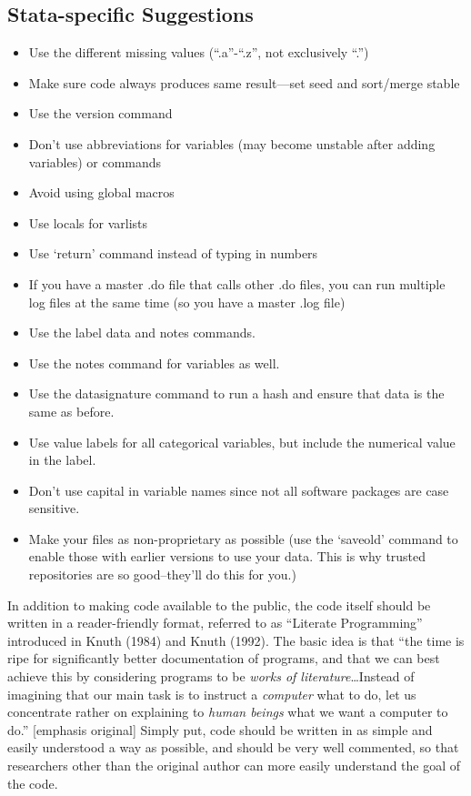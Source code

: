 \documentclass[12pt] {article}
\begin{document}
\subsection{Stata-specific
Suggestions}\label{stata-specific-suggestions}

\begin{itemize}
\item
  Use the different missing values (``.a''-``.z'', not exclusively
  ``.'')
\item
  Make sure code always produces same result---set seed and sort/merge
  stable
\item
  Use the version command
\item
  Don't use abbreviations for variables (may become unstable after
  adding variables) or commands
\item
  Avoid using global macros
\item
  Use locals for varlists
\item
  Use `return' command instead of typing in numbers
\item
  If you have a master .do file that calls other .do files, you can run
  multiple log files at the same time (so you have a master .log file)
\item
  Use the label data and notes commands.
\item
  Use the notes command for variables as well.
\item
  Use the datasignature command to run a hash and ensure that data is
  the same as before.
\item
  Use value labels for all categorical variables, but include the
  numerical value in the label.
\item
  Don't use capital in variable names since not all software packages
  are case sensitive.
\item
  Make your files as non-proprietary as possible (use the `saveold'
  command to enable those with earlier versions to use your data. This
  is why trusted repositories are so good--they'll do this for you.)
\end{itemize}

In addition to making code available to the public, the code itself
should be written in a reader-friendly format, referred to as ``Literate
Programming'' introduced in Knuth (1984) and Knuth (1992). The basic
idea is that ``the time is ripe for significantly better documentation
of programs, and that we can best achieve this by considering programs
to be \emph{works of literature}\ldots{}Instead of imagining that our
main task is to instruct a \emph{computer} what to do, let us
concentrate rather on explaining to \emph{human beings} what we want a
computer to do.'' {[}emphasis original{]} Simply put, code should be
written in as simple and easily understood a way as possible, and should
be very well commented, so that researchers other than the original
author can more easily understand the goal of the code.
\end{document}
